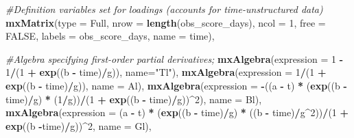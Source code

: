 \documentclass[
12pt, %
twoside,
english]{guelphthesis}
\newenvironment{Shaded}{\begin{snugshade}}{\end{snugshade}}
\newcommand{\AttributeTok}[1]{\textcolor[rgb]{0.13,0.29,0.53}{#1}}
\newcommand{\CommentTok}[1]{\textcolor[rgb]{0.56,0.35,0.01}{\textit{#1}}}
\newcommand{\ConstantTok}[1]{\textcolor[rgb]{0.56,0.35,0.01}{#1}}
\newcommand{\DecValTok}[1]{\textcolor[rgb]{0.00,0.00,0.81}{#1}}
\newcommand{\FunctionTok}[1]{\textcolor[rgb]{0.13,0.29,0.53}{\textbf{#1}}}
\newcommand{\NormalTok}[1]{#1}
\newcommand{\SpecialCharTok}[1]{\textcolor[rgb]{0.81,0.36,0.00}{\textbf{#1}}}
\newcommand{\StringTok}[1]{\textcolor[rgb]{0.31,0.60,0.02}{#1}}
\begin{document}
\begin{Shaded}
\begin{Highlighting}[numbers=left,,]
  \CommentTok{\#Definition variables set for loadings (accounts for time{-}unstructured data) }
  \FunctionTok{mxMatrix}\NormalTok{(}\AttributeTok{type =} \StringTok{\textquotesingle{}Full\textquotesingle{}}\NormalTok{, }\AttributeTok{nrow =} \FunctionTok{length}\NormalTok{(obs\_score\_days), }\AttributeTok{ncol =} \DecValTok{1}\NormalTok{, }\AttributeTok{free =} \ConstantTok{FALSE}\NormalTok{, }
  \AttributeTok{labels =}\NormalTok{ obs\_score\_days, }\AttributeTok{name =} \StringTok{\textquotesingle{}time\textquotesingle{}}\NormalTok{),}

  \CommentTok{\#Algebra specifying first{-}order partial derivatives; }
  \FunctionTok{mxAlgebra}\NormalTok{(}\AttributeTok{expression =} \DecValTok{1} \SpecialCharTok{{-}} \DecValTok{1}\SpecialCharTok{/}\NormalTok{(}\DecValTok{1} \SpecialCharTok{+} \FunctionTok{exp}\NormalTok{((b }\SpecialCharTok{{-}}\NormalTok{ time)}\SpecialCharTok{/}\NormalTok{g)), }\AttributeTok{name=}\StringTok{"Tl"}\NormalTok{),}
  \FunctionTok{mxAlgebra}\NormalTok{(}\AttributeTok{expression =} \DecValTok{1}\SpecialCharTok{/}\NormalTok{(}\DecValTok{1} \SpecialCharTok{+} \FunctionTok{exp}\NormalTok{((b }\SpecialCharTok{{-}}\NormalTok{ time)}\SpecialCharTok{/}\NormalTok{g)), }\AttributeTok{name =} \StringTok{\textquotesingle{}Al\textquotesingle{}}\NormalTok{), }
  \FunctionTok{mxAlgebra}\NormalTok{(}\AttributeTok{expression =} \SpecialCharTok{{-}}\NormalTok{((a }\SpecialCharTok{{-}}\NormalTok{ t) }\SpecialCharTok{*}\NormalTok{ (}\FunctionTok{exp}\NormalTok{((b }\SpecialCharTok{{-}}\NormalTok{ time)}\SpecialCharTok{/}\NormalTok{g) }\SpecialCharTok{*}\NormalTok{ (}\DecValTok{1}\SpecialCharTok{/}\NormalTok{g))}\SpecialCharTok{/}\NormalTok{(}\DecValTok{1} \SpecialCharTok{+} \FunctionTok{exp}\NormalTok{((b }\SpecialCharTok{{-}}\NormalTok{ time)}\SpecialCharTok{/}\NormalTok{g))}\SpecialCharTok{\^{}}\DecValTok{2}\NormalTok{), }\AttributeTok{name =} \StringTok{\textquotesingle{}Bl\textquotesingle{}}\NormalTok{),}
  \FunctionTok{mxAlgebra}\NormalTok{(}\AttributeTok{expression =}\NormalTok{  (a }\SpecialCharTok{{-}}\NormalTok{ t) }\SpecialCharTok{*}\NormalTok{ (}\FunctionTok{exp}\NormalTok{((b }\SpecialCharTok{{-}}\NormalTok{ time)}\SpecialCharTok{/}\NormalTok{g) }\SpecialCharTok{*}\NormalTok{ ((b }\SpecialCharTok{{-}}\NormalTok{ time)}\SpecialCharTok{/}\NormalTok{g}\SpecialCharTok{\^{}}\DecValTok{2}\NormalTok{))}\SpecialCharTok{/}\NormalTok{(}\DecValTok{1} \SpecialCharTok{+} \FunctionTok{exp}\NormalTok{((b }\SpecialCharTok{{-}}\NormalTok{time)}\SpecialCharTok{/}\NormalTok{g))}\SpecialCharTok{\^{}}\DecValTok{2}\NormalTok{, }\AttributeTok{name =} \StringTok{\textquotesingle{}Gl\textquotesingle{}}\NormalTok{),}
  

\end{Highlighting}
\end{Shaded}
\end{document}
